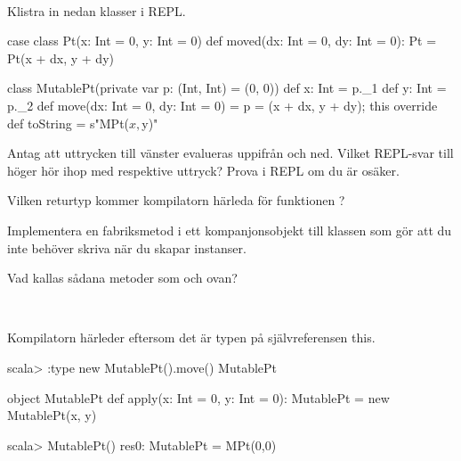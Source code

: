 \QUESTBEGIN

\Task \what~\\Klistra in nedan klasser i REPL.

\begin{Code}
case class Pt(x: Int = 0, y: Int = 0) {
  def moved(dx: Int = 0, dy: Int = 0): Pt = Pt(x + dx, y + dy)
}

class MutablePt(private var p: (Int, Int) = (0, 0)) {
  def x: Int = p._1
  def y: Int = p._2
  def move(dx: Int = 0, dy: Int = 0) = { p = (x + dx, y + dy); this }
  override def toString = s"MPt($x,$y)"
}
\end{Code}

\Subtask
Antag att uttrycken till vänster evalueras uppifrån och ned. Vilket REPL-svar till höger hör ihop med respektive uttryck? Prova i REPL om du är osäker.

\begin{ConceptConnections}

\end{ConceptConnections}

\Subtask Vilken returtyp kommer kompilatorn härleda för funktionen ?

\Subtask Implementera en fabriksmetod  i ett kompanjonsobjekt till klassen  som gör att du inte behöver skriva  när du skapar instanser.

\Subtask Vad kallas sådana metoder som  och  ovan?

\SOLUTION

\TaskSolved \what~

\SubtaskSolved

\begin{ConceptConnections}

\end{ConceptConnections}


\SubtaskSolved Kompilatorn härleder  eftersom det är typen på självreferensen this.
\begin{REPL}
scala> :type new MutablePt().move()
MutablePt
\end{REPL}

\SubtaskSolved
\begin{Code}
object MutablePt {
  def apply(x: Int = 0, y: Int = 0): MutablePt = new MutablePt(x, y)
}
\end{Code}

\begin{REPL}
scala> MutablePt()
res0: MutablePt = MPt(0,0)
\end{REPL}


